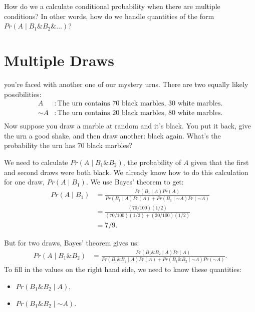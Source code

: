 \documentclass[justified]{tufte-book}
\providecommand{\tightlist}{%
  \setlength{\itemsep}{0pt}\setlength{\parskip}{0pt}}
\newcommand{\given}{\mid}
\renewcommand{\neg}{\mathbin{\sim}}
\renewcommand{\wedge}{\mathbin{\&}}
\newcommand{\p}{Pr}
\theoremstyle{definition}
\theoremstyle{definition}
\theoremstyle{definition}
\theoremstyle{remark}
\begin{document}
How do we a calculate conditional probability when there are multiple conditions? In other words, how do we handle quantities of the form \(\p(A \given B_1 \wedge B_2 \wedge \ldots)\)?

\hypertarget{multiple-draws}{%
\section{Multiple Draws}\label{multiple-draws}}

 you're faced with another one of our mystery urns. There are two equally likely possibilities:
\[
  \begin{aligned}
    A      &: \mbox{The urn contains $70$ black marbles, $30$ white marbles.}\\
    \neg A &: \mbox{The urn contains $20$ black marbles, $80$ white marbles.}\\
  \end{aligned}
\]
Now suppose you draw a marble at random and it's black. You put it back, give the urn a good shake, and then draw another: black again. What's the probability the urn has \(70\) black marbles?

We need to calculate \(\p(A \given B_1 \wedge B_2)\), the probability of \(A\) given that the first and second draws were both black. We already know how to do this calculation for one draw, \(\p(A \given B_1)\). We use Bayes' theorem to get:
\[
  \begin{aligned}
    \p(A \given B_1) &= \frac{\p(B_1 \given A)\p(A)}{\p(B_1 \given A) \p(A) + \p(B_1 \given \neg A) \p(\neg A)} \\
      &= \frac{(70/100)(1/2)}{(70/100)(1/2) + (20/100)(1/2)}\\
      &= 7/9.
  \end{aligned}
\]

But for two draws, Bayes' theorem gives us:
\[
  \begin{aligned}
    \p(A \given B_1 \wedge B_2) &= \frac{\p(B_1 \wedge B_2 \given A)\p(A)}{\p(B_1 \wedge B_2 \given A) \p(A) + \p(B_1 \wedge B_2 \given \neg A) \p(\neg A)}.
  \end{aligned}
\]
To fill in the values on the right hand side, we need to know these quantities:

\begin{itemize}
\tightlist
\item
  \(\p(B_1 \wedge B_2 \given A)\),
\item
  \(\p(B_1 \wedge B_2 \given \neg A)\).
\end{itemize}
\end{document}
